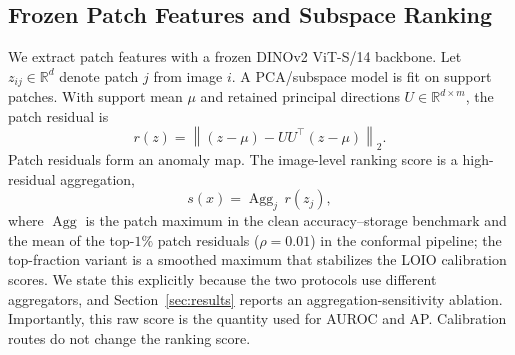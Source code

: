 \subsection{Frozen Patch Features and Subspace Ranking}
We extract patch features with a frozen DINOv2 ViT-S/14 backbone. Let $z_{ij}\in\mathbb{R}^{d}$ denote patch $j$ from image $i$. A PCA/subspace model is fit on support patches. With support mean $\mu$ and retained principal directions $U\in\mathbb{R}^{d\times m}$, the patch residual is
\begin{equation}\label{eq:residual}
    r(z)=\left\|(z-\mu)-UU^{\top}(z-\mu)\right\|_2 .
\end{equation}
Patch residuals form an anomaly map. The image-level ranking score is a high-residual aggregation,
\begin{equation}\label{eq:score}
    s(x)=\operatorname{Agg}_{j}\, r(z_j),
\end{equation}
where $\operatorname{Agg}$ is the patch maximum in the clean accuracy--storage benchmark and the mean of the top-$1\%$ patch residuals ($\rho{=}0.01$) in the conformal pipeline; the top-fraction variant is a smoothed maximum that stabilizes the LOIO calibration scores. We state this explicitly because the two protocols use different aggregators, and Section~\ref{sec:results} reports an aggregation-sensitivity ablation. Importantly, this raw score is the quantity used for AUROC and AP. Calibration routes do not change the ranking score.

